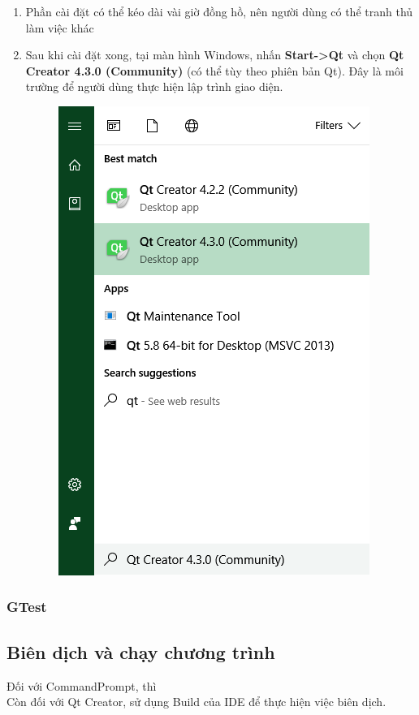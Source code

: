 \documentclass[12pt,a4paper]{report}
\begin{document}
\begin{enumerate}
\begin{figure}[H]
				\end{figure}
				\item Phần cài đặt có thể kéo dài vài giờ đồng hồ, nên người dùng có thể tranh thủ làm việc khác
				\item Sau khi cài đặt xong, tại màn hình Windows, nhấn \textbf{Start->Qt} và chọn \textbf{Qt Creator 4.3.0 (Community)} (có thể tùy theo phiên bản Qt). Đây là môi trường để người dùng thực hiện lập trình giao diện.
				\begin{figure}[H]
					\centering
					\label{F:qtstep7}
					\includegraphics[scale = .7]{Qtstep7.png}
				\end{figure}
			\end{enumerate}
			\subsubsection{GTest}
		\subsection{Biên dịch và chạy chương trình}
		Đối với CommandPrompt, thì \\%
		Còn đối với Qt Creator, sử dụng Build của IDE để thực hiện việc biên dịch.
\end{document}
